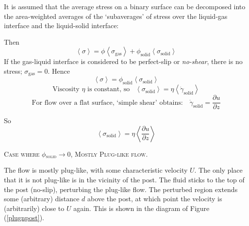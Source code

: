 \documentclass[12pt, a4paper, twoside, openright]{book}
\newcommand{\phisol}{\ensuremath{\phi_{\mathrm{solid}}}}
\newcommand{\sigsol}{\ensuremath{\sigma_{\mathrm{solid}}}}
\begin{document}
It is assumed that the average stress on a binary surface can be decomposed into the area-weighted averages of the `subaverages' of stress over the liquid-gas interface and the liquid-solid interface:

Then 
\begin{equation}
\left< \sigma \right> = \phi \left< \sigma_{\mathrm{gas}} \right> + 
\phisol \left<  \sigsol \right> 
\end{equation}
If the gas-liquid interface is considered to be perfect-slip or \emph{no-shear}, there is no stress; $ \sigma_{\mathrm{gas}} = 0 $.  Hence 
\begin{equation}
\left< \sigma \right> = \phisol \left<  \sigsol \right>
\end{equation}
\begin{equation}
\text{Viscosity $\eta$ is constant, so} \;\;\;
\left< \sigsol \right> = \eta \left< \dot{\gamma}_{\mathrm{solid}} \right>
\end{equation}
\begin{equation}
\text{For flow over a flat surface, `simple shear' obtains:} \quad
\dot{\gamma}_{\mathrm{solid}} = \frac{\partial u}{\partial z}
\end{equation}

So
\begin{equation}
\left< \sigsol \right> = \eta \left< \frac{\partial u}{\partial z} \right>
\end{equation}

\vspace{1em}
\colorbox[gray]{0.8}{ \textsc{Case where $\phisol \rightarrow 0$, Mostly Plug-like flow.} }
\vspace{0.5em}

The flow is mostly plug-like, with some characteristic velocity $U$.  The only place that it is not plug-like is in the vicinity of the post.  The fluid sticks to the top of the post (no-slip), perturbing the plug-like flow.  The perturbed region extends some (arbitrary) distance $d$ above the post, at which point the velocity is (arbitrarily) close to $U$ again.  This is shown in the diagram of Figure (\ref{plugnpost}).

\end{document}
